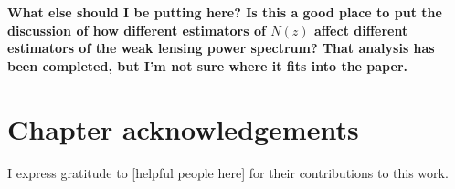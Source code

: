 \textbf{What else should I be putting here?  Is this a good place to put the 
	discussion of how different estimators of $N(z)$ affect different estimators of 
	the weak lensing power spectrum?  That analysis has been completed, but I'm not 
	sure where it fits into the paper.}

\section{Chapter acknowledgements}

I express gratitude to
[helpful people here]
for their contributions to this work.
